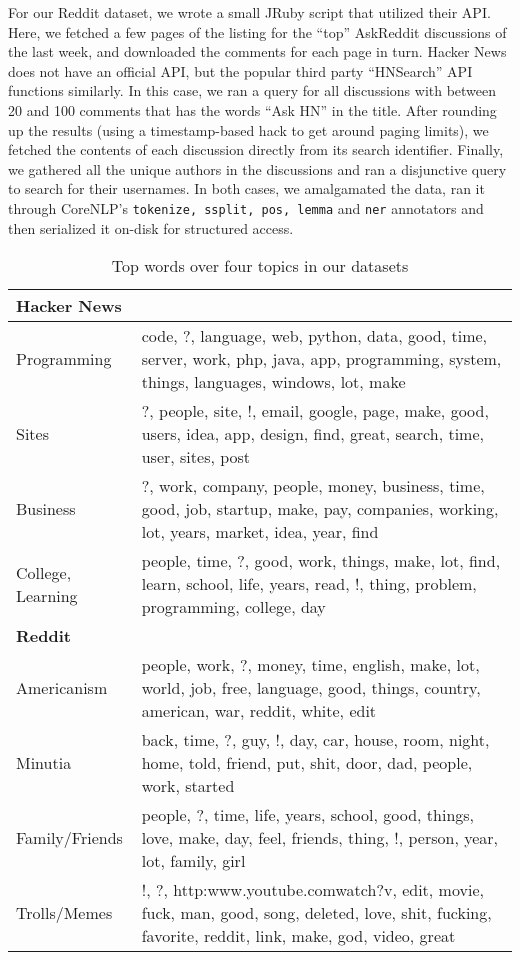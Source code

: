 \documentclass[10pt]{article}
\begin{document}
For our Reddit dataset, we wrote a small JRuby script that utilized their API. Here,
we fetched a few pages of the listing for the ``top'' AskReddit discussions of the last
week, and downloaded the comments for each page in turn. Hacker News does not have
an official API, but the popular third party ``HNSearch'' API functions similarly.
In this case, we ran a query for all discussions with between 20 and 100 comments
that has the words ``Ask HN'' in the title. After rounding up the results (using
a timestamp-based hack to get around paging limits), we fetched the contents of
each discussion directly from its search identifier. Finally, we gathered all
the unique authors in the discussions and ran a disjunctive query to search for
their usernames. In both cases, we amalgamated the data, ran it through
CoreNLP's \texttt{tokenize, ssplit, pos, lemma} and \texttt{ner} annotators and
then serialized it on-disk for structured access.

\begin{table}[h]\footnotesize
  \begin{tabularx}{0.5\textwidth}{| l X |}
   \hline
   \textbf{Hacker News} & \\
   \hline
   Programming  & code, ?, language, web, python, data, good, time, server, work, php, java, app, programming, system, things, languages, windows, lot, make \\

  Sites  & ?, people, site, !, email, google, page, make, good, users, idea, app, design, find, great, search, time, user, sites, post \\

  Business  & ?, work, company, people, money, business, time, good, job, startup, make, pay, companies, working, lot, years, market, idea, year, find \\

  College,  Learning  & people, time, ?, good, work, things, make, lot, find, learn, school, life, years, read, !, thing, problem, programming, college, day \\
   \hline
   \textbf{Reddit} & \\
   \hline
  Americanism & people, work, ?, money, time, english, make, lot, world, job, free, language, good, things, country, american, war, reddit, white, edit \\

  Minutia & back, time, ?, guy, !, day, car, house, room, night, home, told, friend, put, shit, door, dad, people, work, started \\

  Family/Friends  & people, ?, time, life, years, school, good, things, love, make, day, feel, friends, thing, !, person, year, lot, family, girl \\

  Trolls/Memes  & !, ?, http:\/\/www.youtube.com\/watch?v, edit, movie, fuck, man, good, song, deleted, love, shit, fucking, favorite, reddit, link, make, god, video, great \\
   \hline
  \end{tabularx}
  \caption{Top words over four topics in our datasets}
  \label{table:lda}
\end{table}
\end{document}
